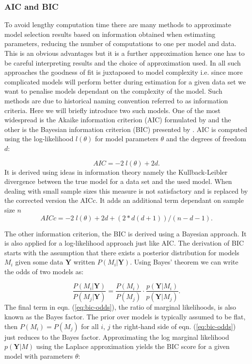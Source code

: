 \subsubsection{AIC and BIC}
\label{sec:aic}

To avoid lengthy computation time there are many methods to approximate model selection results based on information obtained when estimating parameters, reducing the number of computations to one per model and data. This is an obvious advantages but it is a further approximation hence one has to be careful interpreting results and the choice of approximation used. In all such approaches the goodness of fit is juxtaposed to model complexity i.e. since more complicated models will perform better during estimation for a given data set we want to penalise models dependant on the complexity of the model. Such methods are due to historical naming convention referred to as information criteria. Here we will briefly introduce two such models. One of the most widespread is the Akaike information criterion (AIC) formulated by \cite{Akaike:1974ih} and the other is the Bayesian information criterion (BIC) presented by \cite{Schwarz:1978uv}. AIC is computed using the log-likelihood $l(\theta)$ for model parameters $\theta$ and the degrees of freedom $d$:

\begin{equation}
  \label{eq:aic-def}
  AIC = -2 \;l(\theta) + 2 d.
\end{equation}
It is derived using ideas in information theory namely the Kullback-Leibler divergence between the true model for a data set and the used model. When dealing with small sample sizes this measure is not satisfactory and is replaced by the corrected version the AICc. It adds an additional term dependant on sample size $n$
\begin{equation}
 AICc = -2 \; l(\theta) +2d + (2 * d (d + 1)) / (n - d - 1).
\end{equation}


The other information criterion, the BIC is derived using a Bayesian approach. It is also applied for a log-likelihood approach just like AIC. The derivation of BIC starts with the assumption that there exists a posterior distribution for models $M_i$ given some data $\mathbf{Y}$ written $P(M_i| \mathbf{Y})$. Using Bayes' theorem we can write the odds of two models as:

\begin{equation}
  \label{eq:bic-odds}
  \frac{P(M_i|\mathbf{Y})}{P(M_j|\mathbf{Y})} = \frac{P(M_i)}{P(M_j)} \cdot \frac{p(\mathbf{Y}|M_i)}{p(\mathbf{Y} |M_j)}.
\end{equation}
The final term in eqn. (\ref{eq:bic-odds}), the ratio of marginal likelihoods, is also known as the Bayes factor. The prior over models is typically assumed to be flat, then $P(M_i) = P(M_j)$ for all $i$, $j$ the right-hand side of eqn. (\ref{eq:bic-odds}) just reduces to the Bayes factor. Approximating the log marginal likelihood $p(\mathbf{Y} | M)$ using the Laplace approximation yields the BIC score for a given model with parameters $\theta$:

